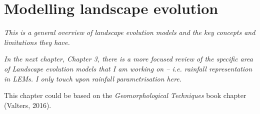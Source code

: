 \chapter{Modelling landscape evolution}
\label{LEMs}
\textit{This is a general overview of landscape evolution models and the key concepts and limitations they have. }

\textit{In the next chapter, Chapter 3, there is a more focused review of the specific area of Landscape evolution models that I am working on -- i.e. rainfall representation in LEMs. I only touch upon rainfall parametrisation here.}

This chapter could be based on the \textit{Geomorphological Techniques} book chapter (Valters, 2016).